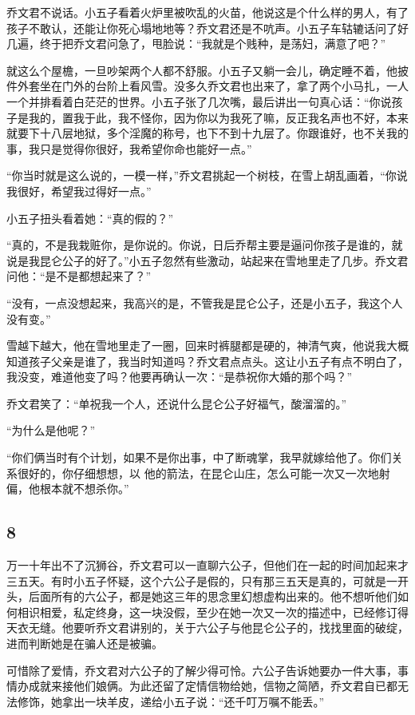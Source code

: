 乔文君不说话。小五子看着火炉里被吹乱的火苗，他说这是个什么样的男人，有了孩子不敢认，还能让你死心塌地地等？乔文君还是不吭声。小五子车轱辘话问了好几遍，终于把乔文君问急了，甩脸说：“我就是个贱种，是荡妇，满意了吧？”

就这么个屋檐，一旦吵架两个人都不舒服。小五子又躺一会儿，确定睡不着，他披件外套坐在门外的台阶上看风雪。没多久乔文君也出来了，拿了两个小马扎，一人一个并排看着白茫茫的世界。小五子张了几次嘴，最后讲出一句真心话：“你说孩子是我的，置我于此，我不怪你，因为你以为我死了嘛，反正我名声也不好，本来就要下十八层地狱，多个淫魔的称号，也下不到十九层了。你跟谁好，也不关我的事，我只是觉得你很好，我希望你命也能好一点。”

“你当时就是这么说的，一模一样，”乔文君挑起一个树枝，在雪上胡乱画着，“你说我很好，希望我过得好一点。”

小五子扭头看着她：“真的假的？”

“真的，不是我栽赃你，是你说的。你说，日后乔帮主要是逼问你孩子是谁的，就说是我昆仑公子的好了。”小五子忽然有些激动，站起来在雪地里走了几步。乔文君问他：“是不是都想起来了？”

“没有，一点没想起来，我高兴的是，不管我是昆仑公子，还是小五子，我这个人没有变。”

雪越下越大，他在雪地里走了一圈，回来时裤腿都是硬的，神清气爽，他说我大概知道孩子父亲是谁了，我当时知道吗？乔文君点点头。这让小五子有点不明白了，我没变，难道他变了吗？他要再确认一次：“是恭祝你大婚的那个吗？”

乔文君笑了：“单祝我一个人，还说什么昆仑公子好福气，酸溜溜的。”

“为什么是他呢？”

“你们俩当时有个计划，如果不是你出事，中了断魂掌，我早就嫁给他了。你们关系很好的，你仔细想想，以
他的箭法，在昆仑山庄，怎么可能一次又一次地射偏，他根本就不想杀你。”
\newline

{\centering\subsection{8}}

万一十年出不了沉狮谷，乔文君可以一直聊六公子，但他们在一起的时间加起来才三五天。有时小五子怀疑，这个六公子是假的，只有那三五天是真的，可就是一开头，后面所有的六公子，都是她这三年的思念里幻想虚构出来的。他不想听他们如何相识相爱，私定终身，这一块没假，至少在她一次又一次的描述中，已经修订得天衣无缝。他要听乔文君讲别的，关于六公子与他昆仑公子的，找找里面的破绽，进而判断她是在骗人还是被骗。

可惜除了爱情，乔文君对六公子的了解少得可怜。六公子告诉她要办一件大事，事情办成就来接他们娘俩。为此还留了定情信物给她，信物之简陋，乔文君自已都无法修饰，她拿出一块羊皮，递给小五子说：“还千叮万嘱不能丢。”

